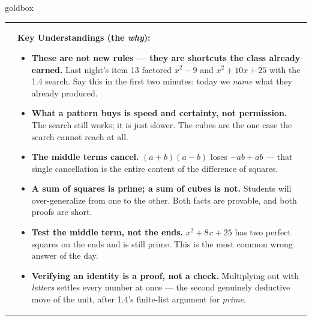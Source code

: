 \documentclass[10pt]{article}
\begin{document}
\begin{skillbox}{goldbox}
\begin{tabularx}{\linewidth}{@{}X|X@{}}
\begin{minipage}[t]{\linewidth}
\end{minipage}
&
\begin{minipage}[t]{\linewidth}\vspace{0pt}
\textbf{Key Understandings (the \emph{why}):}
\begin{itemize}[leftmargin=1.1em, itemsep=2pt, topsep=2pt]
  \item \textbf{These are not new rules --- they are shortcuts the class already earned.} Last
        night's item 13 factored $x^2-9$ and $x^2+10x+25$ with the 1.4 search. Say this in the first
        two minutes: today we \emph{name} what they already produced.
  \item \textbf{What a pattern buys is speed and certainty, not permission.} The search still works;
        it is just slower. The cubes are the one case the search cannot reach at all.
  \item \textbf{The middle terms cancel.} $(a+b)(a-b)$ loses $-ab+ab$ --- that single cancellation
        is the entire content of the difference of squares.
  \item \textbf{A sum of squares is prime; a sum of cubes is not.} Students will over-generalize
        from one to the other. Both facts are provable, and both proofs are short.
  \item \textbf{Test the middle term, not the ends.} $x^2+8x+25$ has two perfect squares on the ends
        and is still prime. This is the most common wrong answer of the day.
  \item \textbf{Verifying an identity is a proof, not a check.} Multiplying out with \emph{letters}
        settles every number at once --- the second genuinely deductive move of the unit, after
        1.4's finite-list argument for \emph{prime}.
\end{itemize}
\end{minipage}
\end{tabularx}
\end{skillbox}
\end{document}
